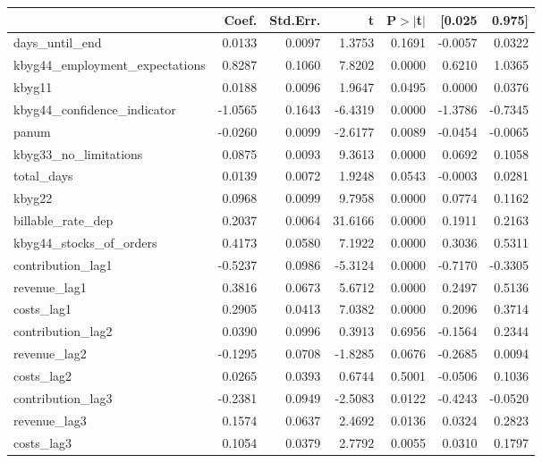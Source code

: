 \begin{table}
\begin{center}
\begin{tabular}{lrrrrrr}
\hline
                                 &   Coef. & Std.Err. &       t & P$> |$t$|$ &  [0.025 &  0.975]  \\
\hline
days\_until\_end                 &  0.0133 &   0.0097 &  1.3753 &      0.1691 & -0.0057 &  0.0322  \\
kbyg44\_employment\_expectations &  0.8287 &   0.1060 &  7.8202 &      0.0000 &  0.6210 &  1.0365  \\
kbyg11                           &  0.0188 &   0.0096 &  1.9647 &      0.0495 &  0.0000 &  0.0376  \\
kbyg44\_confidence\_indicator    & -1.0565 &   0.1643 & -6.4319 &      0.0000 & -1.3786 & -0.7345  \\
panum                            & -0.0260 &   0.0099 & -2.6177 &      0.0089 & -0.0454 & -0.0065  \\
kbyg33\_no\_limitations          &  0.0875 &   0.0093 &  9.3613 &      0.0000 &  0.0692 &  0.1058  \\
total\_days                      &  0.0139 &   0.0072 &  1.9248 &      0.0543 & -0.0003 &  0.0281  \\
kbyg22                           &  0.0968 &   0.0099 &  9.7958 &      0.0000 &  0.0774 &  0.1162  \\
billable\_rate\_dep              &  0.2037 &   0.0064 & 31.6166 &      0.0000 &  0.1911 &  0.2163  \\
kbyg44\_stocks\_of\_orders       &  0.4173 &   0.0580 &  7.1922 &      0.0000 &  0.3036 &  0.5311  \\
contribution\_lag1               & -0.5237 &   0.0986 & -5.3124 &      0.0000 & -0.7170 & -0.3305  \\
revenue\_lag1                    &  0.3816 &   0.0673 &  5.6712 &      0.0000 &  0.2497 &  0.5136  \\
costs\_lag1                      &  0.2905 &   0.0413 &  7.0382 &      0.0000 &  0.2096 &  0.3714  \\
contribution\_lag2               &  0.0390 &   0.0996 &  0.3913 &      0.6956 & -0.1564 &  0.2344  \\
revenue\_lag2                    & -0.1295 &   0.0708 & -1.8285 &      0.0676 & -0.2685 &  0.0094  \\
costs\_lag2                      &  0.0265 &   0.0393 &  0.6744 &      0.5001 & -0.0506 &  0.1036  \\
contribution\_lag3               & -0.2381 &   0.0949 & -2.5083 &      0.0122 & -0.4243 & -0.0520  \\
revenue\_lag3                    &  0.1574 &   0.0637 &  2.4692 &      0.0136 &  0.0324 &  0.2823  \\
costs\_lag3                      &  0.1054 &   0.0379 &  2.7792 &      0.0055 &  0.0310 &  0.1797  \\
\hline
\end{tabular}
\end{center}


\end{table}
